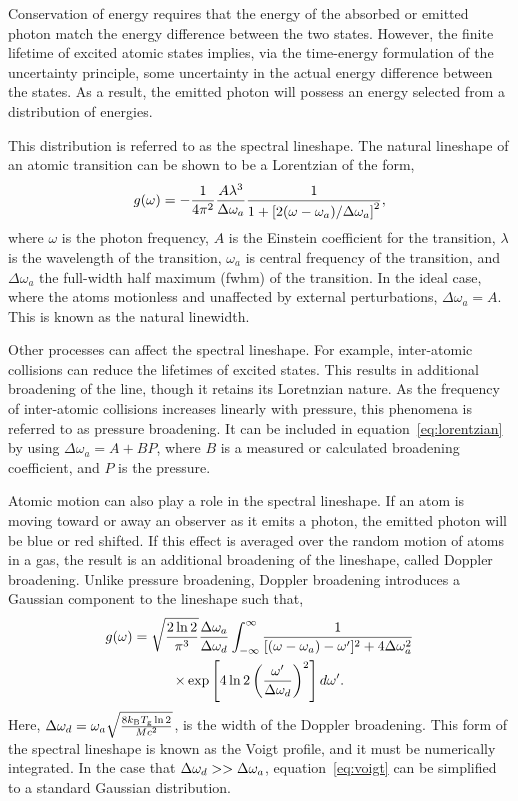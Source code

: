 {Conservation of energy requires that the energy of the absorbed or emitted
photon match the energy difference between the two states. However, the finite
lifetime of excited atomic states implies, via the time-energy formulation of
the uncertainty principle, some uncertainty in the actual energy difference
between the states. As a result, the emitted photon will possess an energy
selected from a distribution of energies.

This distribution is referred to as the spectral lineshape. The natural
lineshape of an atomic transition can be shown \cite{Siegman1986} to be a
Lorentzian of the form,
\begin{equation}
  g(\omega) = -\frac{1}{4\pi^2}\frac{A\lambda^3}{\Delta \omega_a}
  \frac{1}{1 + \left[2(\omega-\omega_a)/\Delta \omega_a\right]^2},
  \label{eq:lorentzian}
\end{equation}
where $\omega$ is the photon frequency, $A$ is the Einstein coefficient for the
transition, $\lambda$ is the wavelength of the transition, $\omega_a$ is central
frequency of the transition, and $\Delta\omega_a$ the full-width half maximum
(\acs{fwhm}) of the transition. In the ideal case, where the atoms motionless
and unaffected by external perturbations, $\Delta\omega_a = A$. This is known as
the natural linewidth.

Other processes can affect the spectral lineshape. For example, inter-atomic
collisions can reduce the lifetimes of excited states. This results in
additional broadening of the line, though it retains its Loretnzian nature. As
the frequency of inter-atomic collisions increases linearly with pressure, this
phenomena is referred to as pressure broadening. It can be included in
equation~\ref{eq:lorentzian} by using $\Delta\omega_a = A + BP$, where $B$ is a
measured or calculated broadening coefficient, and $P$ is the pressure.

Atomic motion can also play a role in the spectral lineshape. If an atom is
moving toward or away an observer as it emits a photon, the emitted photon will
be blue or red shifted. If this effect is averaged over the random motion of
atoms in a gas, the result is an additional broadening of the lineshape, called
Doppler broadening. Unlike pressure broadening, Doppler broadening introduces a
Gaussian component to the lineshape such that,
\begin{multline}
  g(\omega) = \sqrt{\frac{2\ln{2}}{\pi^3}}\frac{\Delta \omega_a}{\Delta \omega_d}
  \int_{-\infty}^\infty
  \frac{1}{[(\omega - \omega_a) - \omega']^2 + 4\Delta \omega_a^2} \\
  \times \exp\left[4\ln{2}\left(\frac{\omega'}{\Delta \omega_d}\right)^2\right]d\omega'.
  \label{eq:voigt}
\end{multline}
Here, $\Delta \omega_d = \omega_a\sqrt{\frac{8k_\mathrm{B}T_\mathrm{g}\ln{2}} {Mc^2}}$, is
the width of the Doppler broadening. This form of the spectral lineshape is
known as the Voigt profile, and it must be numerically integrated. In the case
that $\Delta \omega_d >> \Delta \omega_a$, equation~\ref{eq:voigt} can be simplified to a standard
Gaussian distribution.

}
